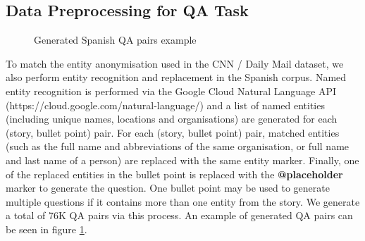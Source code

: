 \documentclass[]{article}
\begin{document}
\subsection{Data Preprocessing for QA Task}

\begin{center}
	\begin{figure}
	\caption{Generated Spanish QA pairs example}
	\label{fig:esqa}
	\end{figure}
\end{center}

To match the entity anonymisation used in the CNN / Daily Mail dataset, we also perform entity recognition and replacement in the Spanish corpus. Named entity recognition is performed via the Google Cloud Natural Language API (https://cloud.google.com/natural-language/) and a list of named entities (including unique names, locations and organisations) are generated for each (story, bullet point) pair. For each (story, bullet point) pair, matched entities (such as the full name and abbreviations of the same organisation, or full name and last name of a person) are replaced with the same entity marker. Finally, one of the replaced entities in the bullet point is replaced with the \textbf{@placeholder} marker to generate the question. One bullet point may be used to generate multiple questions if it contains more than one entity from the story. We generate a total of 76K QA pairs via this process. An example of generated QA pairs can be seen in figure \ref{fig:esqa}.
\end{document}
